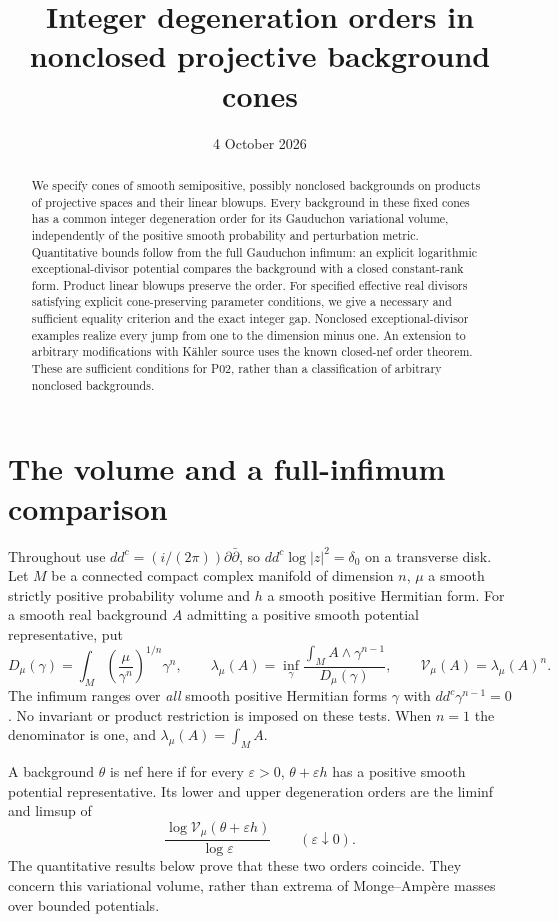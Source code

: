 \documentclass[11pt]{article}
\title{Integer degeneration orders in nonclosed projective background cones}
\author{}
\date{4 October 2026}
\newcommand{\ddc}{dd^c}
\newcommand{\V}{\mathcal V}
\begin{document}
\maketitle
\begin{abstract}
We specify cones of smooth semipositive, possibly nonclosed backgrounds
on products of projective spaces and their linear blowups. Every
background in these fixed cones has a common integer degeneration
order for its Gauduchon variational volume, independently of the
positive smooth probability and perturbation metric. Quantitative
bounds follow from the full Gauduchon infimum: an explicit logarithmic
exceptional-divisor potential compares the background with a closed
constant-rank form. Product linear blowups preserve the order. For
specified effective real divisors satisfying explicit cone-preserving
parameter conditions, we give a necessary and sufficient equality criterion and the
exact integer gap. Nonclosed exceptional-divisor examples realize
every jump from one to the dimension minus one. An extension to
arbitrary modifications with K\"ahler source uses the known closed-nef
order theorem. These are sufficient conditions for P02, rather than
a classification of arbitrary nonclosed backgrounds.
\end{abstract}

\section{The volume and a full-infimum comparison}
Throughout use $\ddc=(i/(2\pi))\partial\bar\partial$, so
$\ddc\log|z|^2=\delta_0$ on a transverse disk. Let $M$ be a
connected compact complex manifold of dimension $n$, $\mu$ a smooth
strictly positive probability volume and $h$ a smooth positive Hermitian
form. For a smooth real background $A$ admitting a positive smooth
potential representative, put
\[
 D_\mu(\gamma)=\int_M
       \left(\frac{\mu}{\gamma^n}\right)^{1/n}\gamma^n,
 \qquad
 \lambda_\mu(A)=\inf_{\gamma}
       \frac{\int_M A\wedge\gamma^{n-1}}{D_\mu(\gamma)},
 \qquad \V_\mu(A)=\lambda_\mu(A)^n.
\]
The infimum ranges over \emph{all} smooth positive Hermitian forms
$\gamma$ with $\ddc\gamma^{n-1}=0$. No invariant or product
restriction is imposed on these tests. When $n=1$ the denominator is
one, and $\lambda_\mu(A)=\int_M A$.

A background $\theta$ is nef here if for every $\varepsilon>0$,
$\theta+\varepsilon h$ has a positive smooth potential representative.
Its lower and upper degeneration orders are the liminf and limsup of
\[
 \frac{\log\V_\mu(\theta+\varepsilon h)}{\log\varepsilon}
 \qquad(\varepsilon\downarrow0).
\]
The quantitative results below prove that these two orders coincide.
They concern this variational volume, rather than extrema of
Monge--Amp\`ere masses over bounded potentials.
\end{document}
